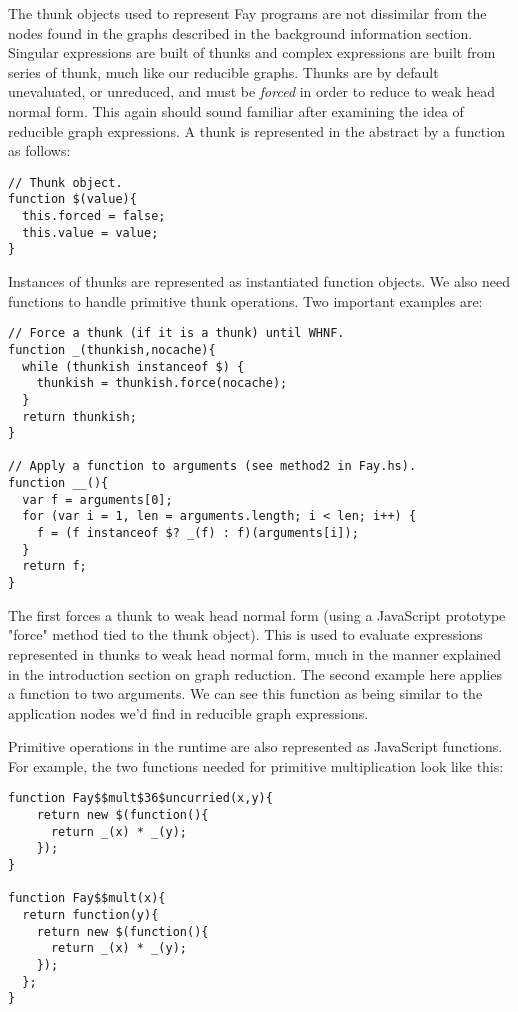 The thunk objects used to represent Fay programs are not dissimilar from the
nodes found in the graphs described in the background information section.
Singular expressions are built of thunks and complex expressions are built
from series of thunk, much like our reducible graphs. Thunks are by default
unevaluated, or unreduced, and must be \emph{forced} in order to reduce to
weak head normal form. This again should sound familiar after examining the
idea of reducible graph expressions. A thunk is represented in the abstract
by a function as follows:

\begin{verbatim}
// Thunk object.
function $(value){
  this.forced = false;
  this.value = value;
}
\end{verbatim}

Instances of thunks are represented as instantiated function objects.
We also need functions to handle primitive thunk operations. Two important
examples are: 

\begin{verbatim}
// Force a thunk (if it is a thunk) until WHNF.
function _(thunkish,nocache){
  while (thunkish instanceof $) {
    thunkish = thunkish.force(nocache);
  }
  return thunkish;
}

// Apply a function to arguments (see method2 in Fay.hs).
function __(){
  var f = arguments[0];
  for (var i = 1, len = arguments.length; i < len; i++) {
    f = (f instanceof $? _(f) : f)(arguments[i]);
  }
  return f;
}
\end{verbatim}

The first forces a thunk to weak head normal form (using a JavaScript
prototype "force" method tied to the thunk object). This is used to 
evaluate expressions represented in thunks to weak head normal form,
much in the manner explained in the introduction section on graph
reduction. The second example here applies a function to two arguments.
We can see this function as being similar to the application nodes
we'd find in reducible graph expressions. 

Primitive operations in the runtime are also represented as JavaScript
functions. For example, the two functions needed for primitive
multiplication look like this:

\begin{verbatim}
function Fay$$mult$36$uncurried(x,y){
    return new $(function(){
      return _(x) * _(y);
    });
}

function Fay$$mult(x){
  return function(y){
    return new $(function(){
      return _(x) * _(y);
    });
  };
}
\end{verbatim}

